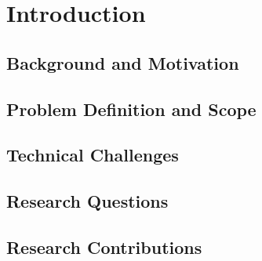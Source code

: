\chapter{Introduction}
\label{ch:introduction}

\section{Background and Motivation}
\label{sec:1-1}


\section{Problem Definition and Scope}
\label{sec:1-2}


\section{Technical Challenges}
\label{sec:1-3}


\section{Research Questions}
\label{sec:1-4}


\section{Research Contributions}
\label{sec:1-5}

